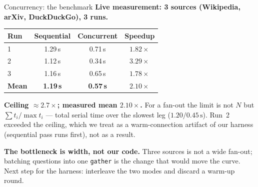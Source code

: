 \documentclass[aspectratio=169,11pt]{beamer}
\begin{document}
\begin{frame}{Concurrency: the benchmark}
  \textbf{Live measurement: 3 sources (Wikipedia, arXiv, DuckDuckGo), 3 runs.}

  \vspace{0.3em}
  \begin{center}\footnotesize
  \begin{tabular}{lccc}
    \toprule
    \textbf{Run} & \textbf{Sequential} & \textbf{Concurrent} & \textbf{Speedup} \\
    \midrule
    1 & 1.29\,s & 0.71\,s & $1.82\times$ \\
    2 & 1.12\,s & 0.34\,s & $3.29\times$ \\
    3 & 1.16\,s & 0.65\,s & $1.78\times$ \\
    \midrule
    \textbf{Mean} & \textbf{1.19\,s} & \textbf{0.57\,s} & $\mathbf{2.10\times}$ \\
    \bottomrule
  \end{tabular}
  \end{center}

  \vspace{0.2em}
  {\small
  \textbf{Ceiling $\approx 2.7\times$; measured mean $2.10\times$.} For a fan-out the limit is not
  $N$ but $\sum t_i / \max t_i$ --- total serial time over the slowest leg
  ($1.20 / 0.45\,\mathrm{s}$). Run~2 exceeded the ceiling, which we treat as a warm-connection
  artifact of our harness (sequential pass runs first), not as a result.

  \smallskip
  \textbf{The bottleneck is width, not our code.} Three sources is not a wide fan-out; batching
  questions into one \texttt{gather} is the change that would move the curve. Next step for the
  harness: interleave the two modes and discard a warm-up round.}
\end{frame}
\end{document}
